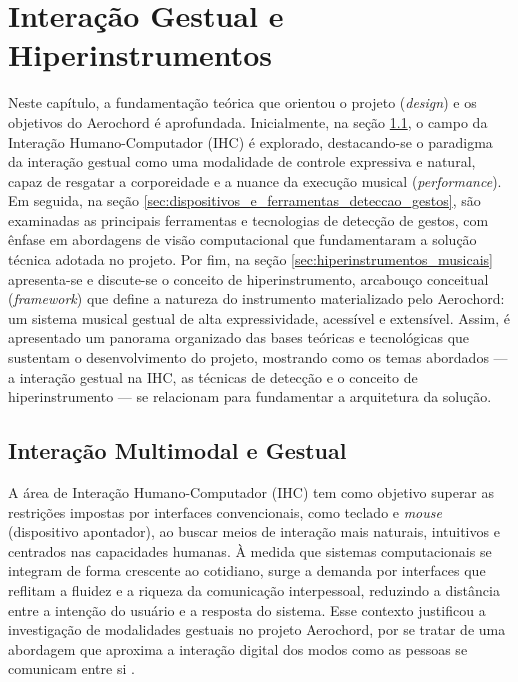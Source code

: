 \chapter{Interação Gestual e Hiperinstrumentos}
\label{cap:interacao_gestual_e_hiperinstrumentos}

Neste capítulo, a fundamentação teórica que orientou o projeto (\textit{design}) e os objetivos do Aerochord é aprofundada. Inicialmente, na seção \ref{sec:iteracao_multimodal}, o campo da Interação Humano-Computador (IHC) é explorado, destacando-se o paradigma da interação gestual como uma modalidade de controle expressiva e natural, capaz de resgatar a corporeidade e a nuance da execução musical (\textit{performance}). Em seguida, na seção \ref{sec:dispositivos_e_ferramentas_deteccao_gestos}, são examinadas as principais ferramentas e tecnologias de detecção de gestos, com ênfase em abordagens de visão computacional que fundamentaram a solução técnica adotada no projeto. Por fim, na seção \ref{sec:hiperinstrumentos_musicais} apresenta-se e discute-se o conceito de hiperinstrumento, arcabouço conceitual (\textit{framework}) que define a natureza do instrumento materializado pelo Aerochord: um sistema musical gestual de alta expressividade, acessível e extensível. Assim, é apresentado um panorama organizado das bases teóricas e tecnológicas que sustentam o desenvolvimento do projeto, mostrando como os temas abordados — a interação gestual na IHC, as técnicas de detecção e o conceito de hiperinstrumento — se relacionam para fundamentar a arquitetura da solução.

\section{Interação Multimodal e Gestual}
\label{sec:iteracao_multimodal}

A área de Interação Humano-Computador (IHC) tem como objetivo superar as restrições impostas por interfaces convencionais, como teclado e \textit{mouse} (dispositivo apontador), ao buscar meios de interação mais naturais, intuitivos e centrados nas capacidades humanas. À medida que sistemas computacionais se integram de forma crescente ao cotidiano, surge a demanda por interfaces que reflitam a fluidez e a riqueza da comunicação interpessoal, reduzindo a distância entre a intenção do usuário e a resposta do sistema. Esse contexto justificou a investigação de modalidades gestuais no projeto Aerochord, por se tratar de uma abordagem que aproxima a interação digital dos modos como as pessoas se comunicam entre si \cite{preece2023interaction}.


